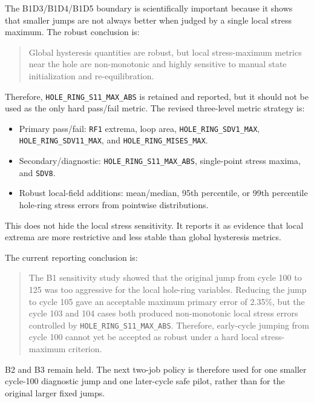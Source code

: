 \documentclass[11pt,a4paper]{article}
\newcommand{\code}[1]{\texttt{#1}}
\begin{document}
The B1D3/B1D4/B1D5 boundary is scientifically important because it shows that smaller jumps are not always better when judged by a single local stress maximum. The robust conclusion is:

\begin{quote}
Global hysteresis quantities are robust, but local stress-maximum metrics near the hole are non-monotonic and highly sensitive to manual state initialization and re-equilibration.
\end{quote}

Therefore, \code{HOLE\_RING\_S11\_MAX\_ABS} is retained and reported, but it should not be used as the only hard pass/fail metric. The revised three-level metric strategy is:

\begin{itemize}
  \item Primary pass/fail: \code{RF1} extrema, loop area, \code{HOLE\_RING\_SDV1\_MAX}, \code{HOLE\_RING\_SDV11\_MAX}, and \code{HOLE\_RING\_MISES\_MAX}.
  \item Secondary/diagnostic: \code{HOLE\_RING\_S11\_MAX\_ABS}, single-point stress maxima, and \code{SDV8}.
  \item Robust local-field additions: mean/median, 95th percentile, or 99th percentile hole-ring stress errors from pointwise distributions.
\end{itemize}

This does not hide the local stress sensitivity. It reports it as evidence that local extrema are more restrictive and less stable than global hysteresis metrics.

The current reporting conclusion is:

\begin{quote}
The B1 sensitivity study showed that the original jump from cycle 100 to 125 was too aggressive for the local hole-ring variables. Reducing the jump to cycle 105 gave an acceptable maximum primary error of 2.35\%, but the cycle 103 and 104 cases both produced non-monotonic local stress errors controlled by \code{HOLE\_RING\_S11\_MAX\_ABS}. Therefore, early-cycle jumping from cycle 100 cannot yet be accepted as robust under a hard local stress-maximum criterion.
\end{quote}

B2 and B3 remain held. The next two-job policy is therefore used for one smaller cycle-100 diagnostic jump and one later-cycle safe pilot, rather than for the original larger fixed jumps.
\end{document}
